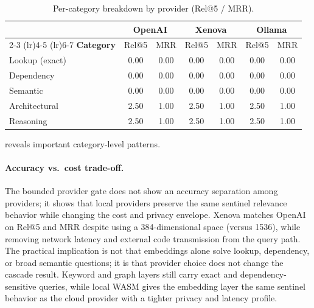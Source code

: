 \documentclass[conference]{IEEEtran}
\providecommand{\measuredFrom}[1]{}
\begin{document}
\begin{table}[t]
  \centering
  \caption{Per-category breakdown by provider (Rel@5 / MRR).}
  \label{tab:embedding-categories}
  \measuredFrom{HoloScript/packages/absorb-service/benchmark-providers.mjs}%
  \begin{tabular}{lcccccc}
    \toprule
    & \multicolumn{2}{c}{\textbf{OpenAI}} &
      \multicolumn{2}{c}{\textbf{Xenova}} &
      \multicolumn{2}{c}{\textbf{Ollama}} \\
    \cmidrule(lr){2-3} \cmidrule(lr){4-5} \cmidrule(lr){6-7}
    \textbf{Category} & Rel@5 & MRR & Rel@5 & MRR & Rel@5 & MRR \\
    \midrule
    Lookup (exact)   & 0.00 & 0.00 & 0.00 & 0.00 & 0.00 & 0.00 \\
    Dependency       & 0.00 & 0.00 & 0.00 & 0.00 & 0.00 & 0.00 \\
    Semantic         & 0.00 & 0.00 & 0.00 & 0.00 & 0.00 & 0.00 \\
    Architectural    & 2.50 & 1.00 & 2.50 & 1.00 & 2.50 & 1.00 \\
    Reasoning        & 2.50 & 1.00 & 2.50 & 1.00 & 2.50 & 1.00 \\
    \bottomrule
  \end{tabular}
\end{table}

 reveals important category-level
patterns.

\paragraph{Accuracy vs.\ cost trade-off.}
The bounded provider gate does not show an accuracy separation among
providers; it shows that local providers preserve the same sentinel
relevance behavior while changing the cost and privacy envelope. Xenova
matches OpenAI on Rel@5 and MRR despite using a 384-dimensional space
(versus 1536), while removing network latency and external code
transmission from the query path. The practical implication is not that
embeddings alone solve lookup, dependency, or broad semantic questions;
it is that provider choice does not change the cascade result. Keyword
and graph layers still carry exact and dependency-sensitive queries,
while local WASM gives the embedding layer the same sentinel behavior as
the cloud provider with a tighter privacy and latency profile.
\end{document}

